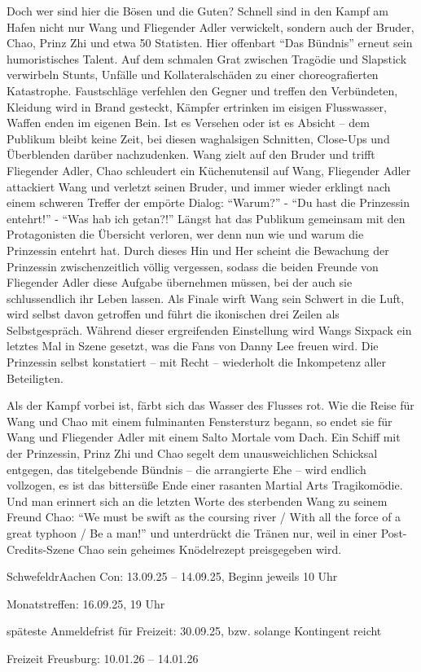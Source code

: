 \documentclass[final]{multiversum}
\newcommand{\schwedracon}{Schwefel\-drAachen Con}
\begin{document}
Doch wer sind hier die Bösen und die Guten? Schnell sind in den Kampf am Hafen
nicht nur Wang und Fliegender Adler verwickelt, sondern auch der Bruder, Chao, Prinz Zhi und etwa 50 Statisten.
Hier offenbart \enquote{Das Bündnis} erneut sein humoristisches Talent.
Auf dem schmalen Grat zwischen Tragödie und Slapstick verwirbeln Stunts, Unfälle und Kollateralschäden zu einer
choreografierten Katastrophe.
Faustschläge verfehlen den Gegner und treffen den Verbündeten, Kleidung wird in Brand gesteckt,
Kämpfer ertrinken im eisigen Flusswasser, Waffen enden im eigenen Bein.
Ist es Versehen oder ist es Absicht -- dem Publikum bleibt keine Zeit, bei diesen waghalsigen Schnitten,
Close-Ups und Überblenden darüber nachzudenken.
Wang zielt auf den Bruder und trifft Fliegender Adler, Chao schleudert ein Küchenutensil auf Wang,
Fliegender Adler attackiert Wang und verletzt seinen Bruder,
und immer wieder erklingt nach einem schweren Treffer der empörte Dialog:
\enquote{Warum?} - \enquote{Du hast die Prinzessin entehrt!} - \enquote{Was hab ich getan?!}
Längst hat das Publikum gemeinsam mit den Protagonisten die Übersicht verloren,
wer denn nun wie und warum die Prinzessin entehrt hat.
Durch dieses Hin und Her scheint die Bewachung der Prinzessin zwischenzeitlich völlig vergessen,
sodass die beiden Freunde von Fliegender Adler diese Aufgabe übernehmen müssen,
bei der auch sie schlussendlich ihr Leben lassen.
Als Finale wirft Wang sein Schwert in die Luft,
wird selbst davon getroffen und führt die ikonischen drei Zeilen als Selbstgespräch.
Während dieser ergreifenden Einstellung wird Wangs Sixpack ein letztes Mal in Szene gesetzt,
was die Fans von Danny Lee freuen wird.
Die Prinzessin selbst konstatiert -- mit Recht -- wiederholt die Inkompetenz aller Beteiligten.

Als der Kampf vorbei ist, färbt sich das Wasser des Flusses rot.
Wie die Reise für Wang und Chao mit einem fulminanten Fenstersturz begann,
so endet sie für Wang und Fliegender Adler mit einem Salto Mortale vom Dach.
Ein Schiff mit der Prinzessin, Prinz Zhi und Chao segelt dem unausweichlichen Schicksal entgegen,
das titelgebende Bündnis -- die arrangierte Ehe -- wird endlich vollzogen,
es ist das bittersüße Ende einer rasanten Martial Arts Tragikomödie.
Und man erinnert sich an die letzten Worte des sterbenden Wang zu seinem Freund Chao:
\enquote{We must be swift as the coursing river / With all the force of a great typhoon / Be a man!}
und unterdrückt die Tränen nur, weil in einer Post-Credits-Szene Chao sein geheimes Knödelrezept preisgegeben wird.

\begin{termine}
  \item \schwedracon{}: 13.09.25 -- 14.09.25, \mbox{Beginn} jeweils 10 Uhr
  \item Monatstreffen: 16.09.25, 19 Uhr
  \item späteste Anmeldefrist für Freizeit: 30.09.25, bzw. solange Kontingent reicht
  \item Freizeit Freusburg: 10.01.26 -- 14.01.26
\end{termine}
\impressum
\end{document}
